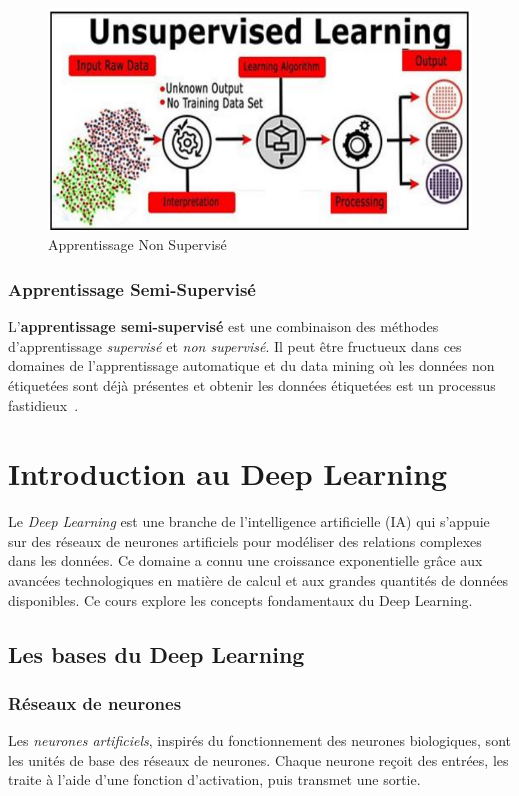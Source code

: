 \begin{figure}[!h]
	\centering
	\includegraphics[width=0.6\linewidth]{images/unsupervisedlearning}
	\caption{Apprentissage Non Supervisé}
	\label{fig:unsupervisedlearning}
\end{figure}

\subsubsection{Apprentissage Semi-Supervisé}
L'\textbf{apprentissage semi-supervisé} est une combinaison des méthodes d'apprentissage \textit{supervisé} et \textit{non supervisé}. Il peut être fructueux dans ces domaines de l'apprentissage automatique et du data mining où les données non étiquetées sont déjà présentes et obtenir les données étiquetées est un processus fastidieux~\cite{Machine2020Batta}. 

\section{Introduction au Deep Learning}

Le \textit{Deep Learning} est une branche de l'intelligence artificielle (IA) qui s'appuie sur des réseaux de neurones artificiels pour modéliser des relations complexes dans les données. Ce domaine a connu une croissance exponentielle grâce aux avancées technologiques en matière de calcul et aux grandes quantités de données disponibles. Ce cours explore les concepts fondamentaux du Deep Learning.

\subsection{Les bases du Deep Learning}

\subsubsection{Réseaux de neurones}

	 Les \textit{neurones artificiels}, inspirés du fonctionnement des neurones biologiques, sont les unités de base des réseaux de neurones. Chaque neurone reçoit des entrées, les traite à l'aide d'une fonction d'activation, puis transmet une sortie.
	 
